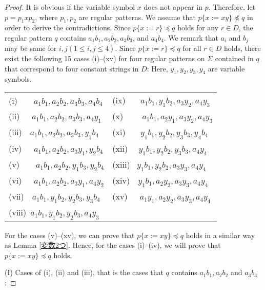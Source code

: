 \begin{proof}
It is obvious if the variable symbol $x$ does not appear in $p$.
Therefore, let $p=p_{1}xp_{2}$, where $p_{1}, p_{2}$ are regular patterns.
We assume that $p \{ x := xy \} \not \preceq q$ in order to derive the contradictions.
Since $p \{ x := r \} \preceq q$ holds for any $r \in D$,
the regular pattern $q$ contains $a_{1}b_{1}, a_{2}b_{2}, a_{3}b_{3}$, and $a_{4}b_{4}$.
We remark that $a_i$ and $b_j$ may be same for $i,j (1\le i,j\le 4)$.
Since $p \{ x := r \} \preceq q$ for all $r \in D$ holds, 
there exist the following 15 cases (i)--(xv) for four regular patterns on $\Sigma$ contained in $q$ that correspond to four constant strings in $D$:
Here, $y_1,y_2,y_3,y_4$ are variable symbols.

\medskip  

\noindent
\begin{tabular}{ll}
(i)~~~~$a_{1}b_{1}, a_{2}b_{2}, a_{3}b_{3}, a_{4}b_{4}$  & (ix)~~~ $a_{1}b_{1}, y_{1}b_{2}, a_{3}y_{2}, a_{4}y_{3}$ \\
(ii)~~~$a_{1}b_{1}, a_{2}b_{2}, a_{3}b_{3}, a_{4}y_{1}$  & (x)~~~~ $a_{1}b_{1}, a_{2}y_{1}, a_{3}y_{2}, a_{4}y_{3}$ \\
(iii)~~$a_{1}b_{1}, a_{2}b_{2}, a_{3}b_{3}, y_{1}b_{4}$ & (xi)~~~ $y_{1}b_{1}, y_{2}b_{2}, y_{3}b_{3}, y_{4}b_{4}$ \\
(iv)~~~$a_{1}b_{1}, a_{2}b_{2}, a_{3}y_{1}, y_{2}b_{4}$  & (xii)~~ $y_{1}b_{1}, y_{2}b_{2}, y_{3}b_{3}, a_{4}y_{4}$ \\
(v)~~~~$a_{1}b_{1}, a_{2}b_{2}, y_{1}b_{3}, y_{2}b_{4}$    & (xiii)~ $y_{1}b_{1}, y_{2}b_{2}, a_{3}y_{3}, a_{4}y_{4}$ \\
(vi)~~~$a_{1}b_{1}, a_{2}b_{2}, a_{3}y_{1}, a_{4}y_{2}$   & (xiv)~~$y_{1}b_{1}, a_{2}y_{2}, a_{3}y_{3}, a_{4}y_{4}$ \\
(vii)~~$a_{1}b_{1}, y_{1}b_{2}, y_{2}b_{3}, y_{3}b_{4}$  & (xv)~~~$a_{1}y_{1}, a_{2}y_{2}, a_{3}y_{3}, a_{4}y_{4}$ \\
(viii)~$a_{1}b_{1}, y_{1}b_{2}, y_{2}b_{3}, a_{4}y_{3}$ &        %
\end{tabular}
\medskip

\noindent
For the cases (v)--(xv), we can prove that $p \{ x := xy \} \preceq q$ holds in a similar way as Lemma \ref{変数2つ}.
Hence, for the cases (i)--(iv), we will prove that $p \{ x := xy \} \preceq q$ holds.

\smallskip
\noindent
(I) Cases of (i), (ii) and (iii), that is the cases that $q$ contains $a_{1}b_{1}, a_{2}b_{2}$ and $a_{3}b_{3}$:


\end{proof}
